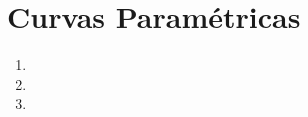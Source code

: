 \section*{Curvas Paramétricas}

	\begin{enumerate}\addtocounter{enumi}{9}
	
		\item 
		
		\item 
		
		\item 

	\end{enumerate}